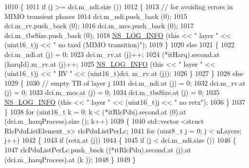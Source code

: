 \begin{DoxyCode}
1010                 \{
1011                   \textcolor{keywordflow}{if} (j >= dci.m\_ndi.size ())
1012                     \{
1013                       \textcolor{comment}{// for avoiding errors in MIMO transient phases}
1014                       dci.m\_ndi.push\_back (0);
1015                       dci.m\_rv.push\_back (0);
1016                       dci.m\_mcs.push\_back (0);
1017                       dci.m\_tbsSize.push\_back (0);
1018                       \hyperlink{group__logging_gafbd73ee2cf9f26b319f49086d8e860fb}{NS\_LOG\_INFO} (\textcolor{keyword}{this} << \textcolor{stringliteral}{" layer "} << (uint16\_t)j << \textcolor{stringliteral}{" no txed (MIMO
       transition)"});
1019                     \}
1020                   \textcolor{keywordflow}{else}
1021                     \{
1022                       dci.m\_ndi.at (j) = 0;
1023                       dci.m\_rv.at (j)++;
1024                       (*itHarq).second.at (harqId).m\_rv.at (j)++;
1025                       \hyperlink{group__logging_gafbd73ee2cf9f26b319f49086d8e860fb}{NS\_LOG\_INFO} (\textcolor{keyword}{this} << \textcolor{stringliteral}{" layer "} << (uint16\_t)j << \textcolor{stringliteral}{" RV "} << (uint16\_t)dci.
      m\_rv.at (j));
1026                     \}
1027                 \}
1028               \textcolor{keywordflow}{else}
1029                 \{
1030                   \textcolor{comment}{// empty TB of layer j}
1031                   dci.m\_ndi.at (j) = 0;
1032                   dci.m\_rv.at (j) = 0;
1033                   dci.m\_mcs.at (j) = 0;
1034                   dci.m\_tbsSize.at (j) = 0;
1035                   \hyperlink{group__logging_gafbd73ee2cf9f26b319f49086d8e860fb}{NS\_LOG\_INFO} (\textcolor{keyword}{this} << \textcolor{stringliteral}{" layer "} << (uint16\_t)j << \textcolor{stringliteral}{" no retx"});
1036                 \}
1037             \}
1038           \textcolor{keywordflow}{for} (uint16\_t k = 0; k < (*itRlcPdu).second.at (0).at (dci.m\_harqProcess).size (); k++)
1039             \{
1040               std::vector <struct RlcPduListElement\_s> rlcPduListPerLc;
1041               \textcolor{keywordflow}{for} (uint8\_t j = 0; j < nLayers; j++)
1042                 \{
1043                   \textcolor{keywordflow}{if} (retx.at (j))
1044                     \{
1045                       \textcolor{keywordflow}{if} (j < dci.m\_ndi.size ())
1046                         \{
1047                           rlcPduListPerLc.push\_back ((*itRlcPdu).second.at (j).at (dci.m\_harqProcess).at (k
      ));
1048                         \}
1049                     \}

\end{DoxyCode}
